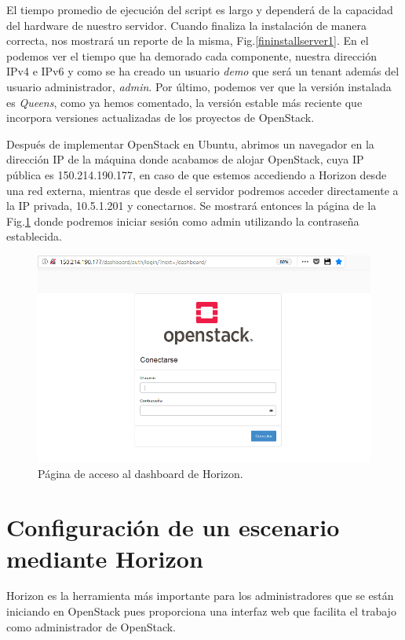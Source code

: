 El tiempo promedio de ejecución del script es largo y dependerá de la capacidad  del hardware de nuestro servidor. Cuando finaliza la instalación de manera correcta, nos mostrará un reporte de la misma, Fig.\ref{fininstallserver1}.
En el podemos ver el tiempo que ha demorado cada componente, nuestra dirección IPv4 e IPv6 y como se ha creado un usuario \textit{demo} que será un tenant además del usuario administrador, \textit{admin}. Por último, podemos ver que la versión instalada es \textit{Queens}, como ya hemos comentado, la versión estable más reciente que incorpora versiones actualizadas de los proyectos de OpenStack.\cite{noauthor_queens_nodate}

Después de implementar OpenStack en Ubuntu, abrimos un navegador en la dirección IP de la máquina donde  acabamos de alojar OpenStack, cuya IP pública es 150.214.190.177, en caso de que estemos accediendo a Horizon desde una red externa, mientras que desde el servidor podremos acceder directamente a la IP privada, 10.5.1.201 y conectarnos. Se mostrará entonces la página de la Fig.\ref{login} donde podremos iniciar sesión como admin utilizando la contraseña establecida. 

\begin{figure}
    \centering
    \includegraphics[width=1\textwidth]{imagenes/capitulo6/login.PNG}
    \caption{Página de acceso al dashboard de Horizon.}
	\vspace{0.3cm}
    \label{login}
\end{figure}

\section{Configuración de un escenario mediante Horizon}
Horizon es la herramienta más importante para los administradores que se están iniciando en OpenStack pues proporciona una interfaz web que facilita el trabajo como administrador de OpenStack.

